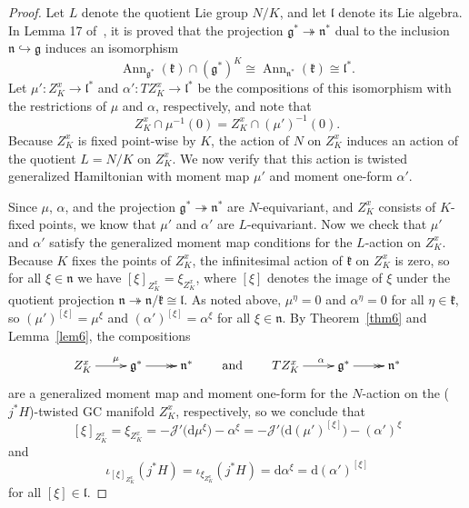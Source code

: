 \documentclass[pdftex]{sigma}
\numberwithin{equation}{section}
\newcommand{\func}[3]{#1 \colon #2 \to #3}
\newcommand{\tang}{T}
\begin{document}
\begin{proof}
Let $L$ denote the quotient Lie group $N/K$, and let $\mathfrak{l}$ denote its Lie algebra.  In Lemma 17 of~\cite{MR1486529}, it is proved that the projection $\mathfrak{g}^* \twoheadrightarrow \mathfrak{n}^*$ dual to the inclusion $\mathfrak{n} \hookrightarrow \mathfrak{g}$ induces an isomorphism
\[
  \operatorname{Ann}_{\mathfrak{g}^*} (\mathfrak{k}) \cap (\mathfrak{g}^*)^K
  \cong
  \operatorname{Ann}_{\mathfrak{n}^*} (\mathfrak{k})
  \cong
  \mathfrak{l}^*.
\]
Let $\func{\mu'}{Z_K^x}{\mathfrak{l}^*}$ and $\func{\alpha'}{\tang Z_K^x}{\mathfrak{l}^*}$ be the compositions of this isomorphism with the restrictions of $\mu$ and $\alpha$, respectively, and note that
\[
  Z_K^x \cap \mu^{-1}(0) = Z_K^x \cap (\mu')^{-1}(0).
\]
Because $Z_K^x$ is f\/ixed point-wise by $K$, the action of $N$ on $Z_K^x$ induces an action of the quotient $L=N/K$ on $Z_K^x$.
We now verify that this action is twisted generalized Hamiltonian with moment map $\mu'$ and moment one-form $\alpha'$.

Since $\mu$, $\alpha$, and the projection $\mathfrak{g}^* \twoheadrightarrow \mathfrak{n}^*$ are $N$-equivariant, and $Z_K^x$ consists of $K$-f\/ixed points, we know that $\mu'$ and $\alpha'$ are $L$-equivariant.  Now we check that $\mu'$ and $\alpha'$ satisfy the generalized moment map conditions for the $L$-action on $Z_K^x$.
Because $K$ f\/ixes the points of $Z_K^x$, the inf\/initesimal action of $\mathfrak{k}$ on $Z_K^x$ is zero, so for all $\xi \in \mathfrak{n}$ we have $[\xi]_{Z_K^x} = \xi_{Z_K^x}$, where $[\xi]$ denotes the image of $\xi$ under the quotient projection $\mathfrak{n} \twoheadrightarrow \mathfrak{n}/\mathfrak{k} \cong \mathfrak{l}$.
As noted above, $\mu^{\eta} = 0$ and $\alpha^{\eta}=0$ for all $\eta \in \mathfrak{k}$, so $(\mu')^{[\xi]} = \mu^{\xi}$ and $(\alpha')^{[\xi]} = \alpha^{\xi}$ for all $\xi \in \mathfrak{n}$.
By Theorem~\ref{thm6} and Lemma~\ref{lem6}, the compositions
  \[
    \xymatrix{
      Z_K^x \ar[r]^{\quad \mu} & \mathfrak{g}^* \ar@{>>}[r] & \mathfrak{n}^*
    }
    \qquad
    \mbox{and}
    \qquad
    \xymatrix{
      \tang Z_K^x \ar[r]^{\quad \alpha}
      & \mathfrak{g}^* \ar@{>>}[r] & \mathfrak{n}^*
    }
  \]
are a generalized moment map and moment one-form for the $N$-action on the ($j^* H$)-twisted GC manifold $Z_K^x$, respectively, so we conclude that
\[
  [\xi]_{Z_K^x} = \xi_{Z_K^x}
  = -\mathcal{J}' \big( \mathrm{d} \mu^{\xi} \big) - \alpha^{\xi}
  = -\mathcal{J}' \big( \mathrm{d} (\mu')^{[\xi]} \big) - (\alpha')^{\xi}
\]
and
\[
  \iota_{[\xi]_{Z_K^x}} (j^* H)
  = \iota_{\xi_{Z_K^x}} (j^* H)
  = \mathrm{d} \alpha^{\xi}
  = \mathrm{d} (\alpha')^{[\xi]}
\]
for all $[\xi] \in \mathfrak{l}$.



\end{proof}
\end{document}
